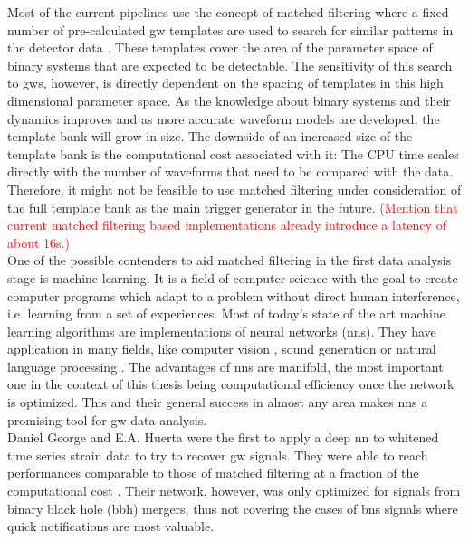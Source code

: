 Most of the current pipelines use the concept of matched filtering where a fixed number of pre-calculated \gls{gw} templates are used to search for similar patterns in the detector data \cite{ligo_pipelines}. These templates cover the area of the parameter space of binary systems that are expected to be detectable. The sensitivity of this search to \gls{gw}s, however, is directly dependent on the spacing of templates in this high dimensional parameter space. As the knowledge about binary systems and their dynamics improves and as more accurate waveform models are developed, the template bank will grow in size. The downside of an increased size of the template bank is the computational cost associated with it: The CPU time scales directly with the number of waveforms that need to be compared with the data. Therefore, it might not be feasible to use matched filtering under consideration of the full template bank as the main trigger generator in the future. \textcolor{red}{(Mention that current matched filtering based implementations already introduce a latency of about 16s.)}\\
One of the possible contenders to aid matched filtering in the first data analysis stage is machine learning. It is a field of computer science with the goal to create computer programs which adapt to a problem without direct human interference, i.e. learning from a set of experiences. Most of today's state of the art machine learning algorithms are implementations of neural networks (\gls{nns}). They have application in many fields, like computer vision \cite{ILSVRC15}, sound generation \cite{wavenet} or natural language processing \cite{natural_language_processing}. The advantages of \gls{nns} are manifold, the most important one in the context of this thesis being computational efficiency once the network is optimized. This and their general success in almost any area makes \gls{nns} a promising tool for \gls{gw} data-analysis.\\
Daniel George and E.A. Huerta were the first to apply a deep \gls{nn} to whitened time series strain data to try to recover \gls{gw} signals. They were able to reach performances comparable to those of matched filtering at a fraction of the computational cost \cite{original_deep_filtering}. Their network, however, was only optimized for signals from binary black hole (\gls{bbh}) mergers, thus not covering the cases of \gls{bns} signals where quick notifications are most valuable.\\
